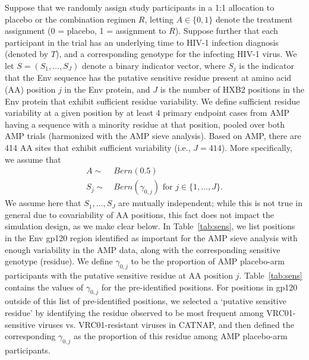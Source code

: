 \documentclass[10pt]{article}
\begin{document}
Suppose that we randomly assign study participants in a 1:1 allocation to placebo or the combination regimen $R$, letting $A \in \{0,1\}$ denote the treatment assignment (0 = placebo, 1 = assignment to $R$). Suppose further that each participant in the trial has an underlying time to HIV-1 infection diagnosis (denoted by $T$), and a corresponding genotype for the infecting HIV-1 virus. We let $S = (S_1, \ldots, S_J)$ denote a binary indicator vector, where $S_j$ is the indicator that the Env sequence has the putative sensitive residue present at amino acid (AA) position $j$ in the Env protein, and $J$ is the number of HXB2 positions in the Env protein that exhibit sufficient residue variability. We define sufficient residue variability at a given position by at least 4 primary endpoint cases from AMP having a sequence with a minority residue at that position, pooled over both AMP trials (harmonized with the AMP sieve analysis). Based on AMP, there are 414 AA sites that exhibit sufficient variability (i.e., $J = 414$). More specifically, we assume that
\begin{align*}
  A \sim & \ Bern(0.5) \\
  S_j \sim & \ Bern(\gamma_{0,j}) \text{ for } j \in \{1, \ldots, J\}.
\end{align*}
We assume here that $S_1, \ldots, S_J$ are mutually independent; while this is not true in general due to covariability of AA positions, this fact does not impact the simulation design, as we make clear below. In Table~\ref{tab:sens}, we list positions in the Env gp120 region identified as important for the AMP sieve analysis with enough variability in the AMP data, along with the corresponding sensitive genotype (residue). We define $\gamma_{0,j}$ to be the proportion of AMP placebo-arm participants with the putative sensitive residue at AA position $j$. Table~\ref{tab:sens} contains the values of $\gamma_{0,j}$ for the pre-identified positions. For positions in gp120 outside of this list of pre-identified positions, we selected a `putative sensitive residue' by identifying the residue observed to be most frequent among VRC01-sensitive viruses vs. VRC01-resistant viruses in CATNAP, and then defined the corresponding $\gamma_{0,j}$ as the proportion of this residue among AMP placebo-arm participants.
\end{document}

